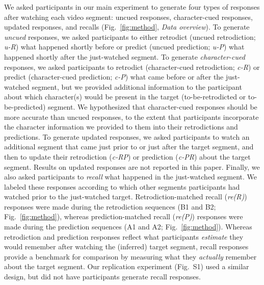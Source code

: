 \documentclass[10pt]{article}
\newcommand{\MethodsReplExp}{S1}
\begin{document}
We asked participants in our main experiment to generate four types of responses after watching each video segment: uncued responses, character-cued responses, updated responses, and recalls (Fig.~\ref{fig:method}, \textit{Data overview}). To generate \textit{uncued} responses, we asked participants to either retrodict (uncued retrodiction; \textit{u-R}) what happened shortly before or predict (uncued prediction; \textit{u-P}) what happened shortly after the just-watched segment. To generate \textit{character-cued} responses, we asked participants to retrodict (character-cued retrodiction; \textit{c-R}) or predict (character-cued prediction; \textit{c-P}) what came before or after the just-watched segment, but we provided additional information to the participant about which character(s) would be present in the target (to-be-retrodicted or to-be-predicted) segment. We hypothesized that character-cued responses should be more accurate than uncued responses, to the extent that participants incorporate the character information we provided to them into their retrodictions and predictions. To generate updated responses, we asked participants to watch an additional segment that came just prior to or just after the target segment, and then to update their retrodiction (\textit{c-RP}) or prediction (\textit{c-PR}) about the target segment. Results on updated responses are not reported in this paper. Finally, we also asked participants to \textit{recall} what happened in the just-watched segment. We labeled these responses according to which other segments participants had watched prior to the just-watched target. Retrodiction-matched recall (\textit{re(R)}) responses were made during the retrodiction sequences (B1 and B2; Fig.~\ref{fig:method}), whereas prediction-matched recall (\textit{re(P)}) responses were made during the prediction sequences (A1 and A2; Fig.~\ref{fig:method}). Whereas retrodiction and prediction responses reflect what participants \textit{estimate} they would remember after watching the (inferred) target segment, recall responses provide a benchmark for comparison by measuring what they \textit{actually} remember about the target segment. Our replication experiment (Fig.~\MethodsReplExp) used a similar design, but did not have participants generate recall responses.
\end{document}
